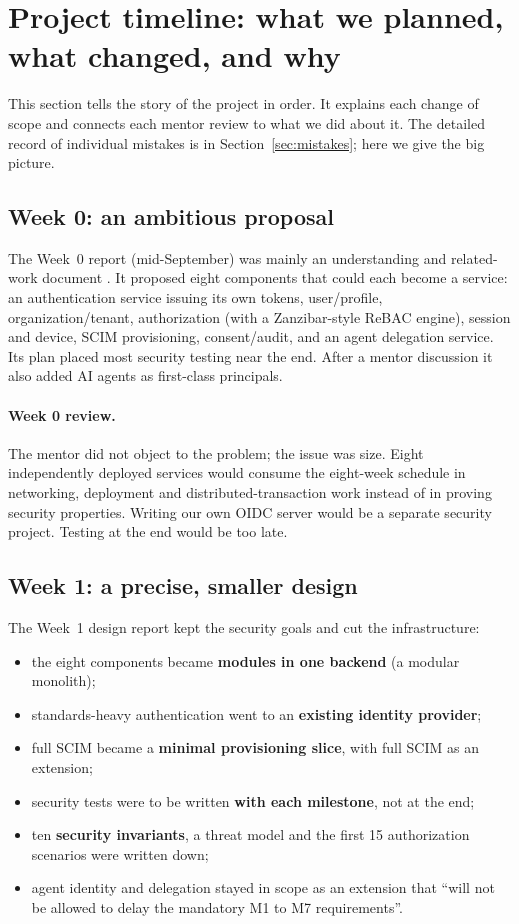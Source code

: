 \section{Project timeline: what we planned, what changed, and why}
\label{sec:timeline}

This section tells the story of the project in order. It explains each change of scope and connects each mentor review to what we did about it. The detailed record of individual mistakes is in Section~\ref{sec:mistakes}; here we give the big picture.

\subsection{Week 0: an ambitious proposal}
The Week~0 report (mid-September) was mainly an understanding and related-work document \cite{week0}. It proposed eight components that could each become a service: an authentication service issuing its own tokens, user/profile, organization/tenant, authorization (with a Zanzibar-style ReBAC engine), session and device, SCIM provisioning, consent/audit, and an agent delegation service. Its plan placed most security testing near the end. After a mentor discussion it also added AI agents as first-class principals.

\paragraph{Week 0 review.} The mentor did not object to the problem; the issue was size. Eight independently deployed services would consume the eight-week schedule in networking, deployment and distributed-transaction work instead of in proving security properties. Writing our own OIDC server would be a separate security project. Testing at the end would be too late.

\subsection{Week 1: a precise, smaller design}
The Week~1 design report \cite{week1} kept the security goals and cut the infrastructure:
\begin{itemize}
  \item the eight components became \textbf{modules in one backend} (a modular monolith);
  \item standards-heavy authentication went to an \textbf{existing identity provider};
  \item full SCIM became a \textbf{minimal provisioning slice}, with full SCIM as an extension;
  \item security tests were to be written \textbf{with each milestone}, not at the end;
  \item ten \textbf{security invariants}, a threat model and the first 15 authorization scenarios were written down;
  \item agent identity and delegation stayed in scope as an extension that ``will not be allowed to delay the mandatory M1 to M7 requirements''.
\end{itemize}


